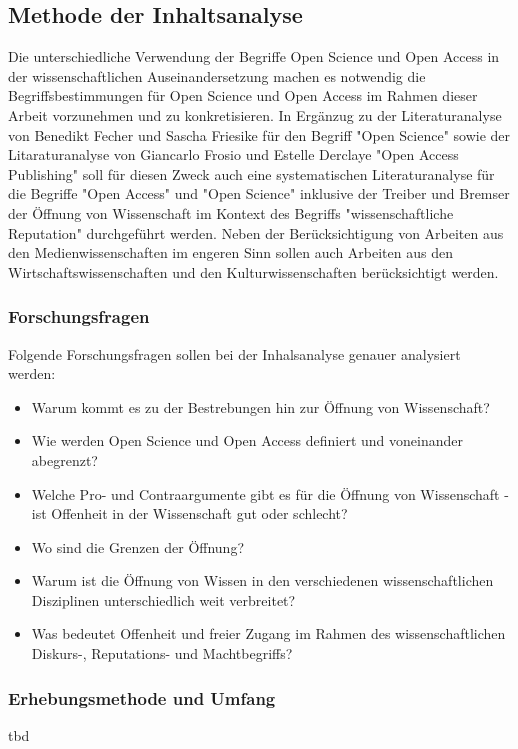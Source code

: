 \subsection{Methode der Inhaltsanalyse}
Die unterschiedliche Verwendung der Begriffe Open Science und Open Access in der wissenschaftlichen Auseinandersetzung machen es notwendig die Begriffsbestimmungen für Open Science und Open Access im Rahmen dieser Arbeit vorzunehmen und zu konkretisieren. In Ergänzug zu der Literaturanalyse von Benedikt Fecher und Sascha Friesike für den Begriff "Open Science"\cite{cite:9} sowie der Litaraturanalyse von Giancarlo Frosio und Estelle Derclaye "Open Access Publishing" \cite{CREATe_2014} soll für diesen Zweck auch eine systematischen Literaturanalyse für die Begriffe "Open Access" und "Open Science" inklusive der Treiber und Bremser der Öffnung von Wissenschaft im Kontext des Begriffs "wissenschaftliche Reputation" durchgeführt werden. Neben der Berücksichtigung von Arbeiten aus den Medienwissenschaften im engeren Sinn sollen auch Arbeiten aus den Wirtschaftswissenschaften und den Kulturwissenschaften berücksichtigt werden.
\subsubsection{Forschungsfragen} 
Folgende Forschungsfragen sollen bei der Inhalsanalyse genauer analysiert werden:
\begin{itemize}
\item Warum kommt es zu der Bestrebungen hin zur Öffnung von Wissenschaft? 
\item Wie werden Open Science und Open Access definiert und voneinander abegrenzt? 
\item Welche Pro- und Contraargumente gibt es für die Öffnung von Wissenschaft - ist Offenheit in der Wissenschaft gut oder schlecht? 
\item Wo sind die Grenzen der Öffnung? 
\item Warum ist die Öffnung von Wissen in den verschiedenen wissenschaftlichen Disziplinen unterschiedlich weit verbreitet? 
\item Was bedeutet Offenheit und freier Zugang im Rahmen des wissenschaftlichen Diskurs-, Reputations- und Machtbegriffs?
\end{itemize}	

\subsubsection{Erhebungsmethode und Umfang} 
tbd

